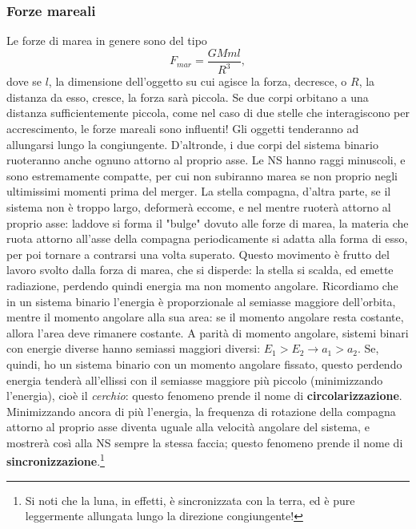 \subsubsection{Forze mareali}
Le forze di marea in genere sono del tipo
\begin{equation}
    F_{mar} = \frac{GMml}{R^3},
    \label{eq: forze mareali}
\end{equation}
dove se $l$, la dimensione dell'oggetto su cui agisce la forza, decresce, o $R$, la distanza da esso, cresce, la forza sarà piccola.
Se due corpi orbitano a una distanza sufficientemente piccola, come nel caso di due stelle che interagiscono per accrescimento, le forze mareali sono influenti!
Gli oggetti tenderanno ad allungarsi lungo la congiungente.
D'altronde, i due corpi del sistema binario ruoteranno anche ognuno attorno al proprio asse.
Le NS hanno raggi minuscoli, e sono estremamente compatte, per cui non subiranno marea se non proprio negli ultimissimi momenti prima del merger.
La stella compagna, d'altra parte, se il sistema non è troppo largo, deformerà eccome, e nel mentre ruoterà attorno al proprio asse:
laddove si forma il "bulge" dovuto alle forze di marea, la materia che ruota attorno all'asse della compagna periodicamente si adatta alla forma di esso, per poi tornare a contrarsi una volta superato.
Questo movimento è frutto del lavoro svolto dalla forza di marea, che si disperde: la stella si scalda, ed emette radiazione, perdendo quindi energia ma non momento angolare.
Ricordiamo che in un sistema binario l'energia è proporzionale al semiasse maggiore dell'orbita, mentre il momento angolare alla sua area: se il momento angolare resta costante, allora l'area deve rimanere costante.
A parità di momento angolare, sistemi binari con energie diverse hanno semiassi maggiori diversi: $E_1>E_2 \xrightarrow{} a_1>a_2$.
Se, quindi, ho un sistema binario con un momento angolare fissato, questo perdendo energia tenderà all'ellissi con il semiasse maggiore più piccolo (minimizzando l'energia), cioè il \textit{cerchio}: questo fenomeno prende il nome di \textbf{circolarizzazione}.
Minimizzando ancora di più l'energia, la frequenza di rotazione della compagna attorno al proprio asse diventa uguale alla velocità angolare del sistema, e mostrerà così alla NS sempre la stessa faccia; questo fenomeno prende il nome di \textbf{sincronizzazione}.\footnote{Si noti che la luna, in effetti, è sincronizzata con la terra, ed è pure leggermente allungata lungo la direzione congiungente!}

